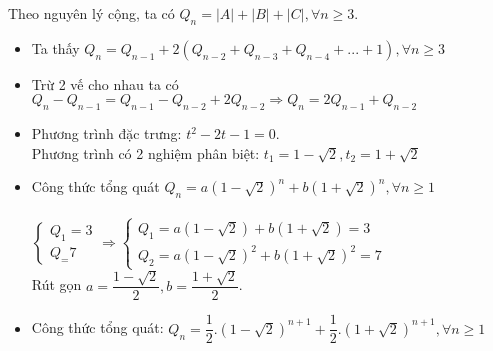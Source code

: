 \documentclass[12pt,oneside]{book}
\begin{document}
Theo nguyên lý cộng, ta có $Q_n=|A|+|B|+|C|, \forall n \geq 3.$
\begin{itemize}
	\item Ta thấy $Q_n = Q_{n-1}+2(Q_{n-2}+Q_{n-3}+Q_{n-4}+...+1), \forall n \geq 3$
	\item Trừ 2 vế cho nhau ta có $Q_n-Q_{n-1}=Q_{n-1}-Q_{n-2}+2Q_{n-2}\Rightarrow Q_n = 2Q_{n-1}+Q_{n-2}$
	\item  Phương trình đặc trưng: $t^2-2t-1 = 0$.
	\\ Phương trình có 2 nghiệm phân biệt: $t_1=1-\sqrt{2}, t_2 = 1+\sqrt{2}$
	\item Công thức tổng quát $Q_n=a(1-\sqrt{2})^n+b(1+\sqrt{2})^n, \forall n \geq 1$\\\\
	$\begin{cases}
		Q_1=3\\Q_=7
	\end{cases}\Rightarrow \begin{cases}
		Q_1=a(1-\sqrt{2})+b(1+\sqrt{2})=3\\
		Q_2=a(1-\sqrt{2})^2+b(1+\sqrt{2})^2=7
	\end{cases}$\\
	Rút  gọn $a = \dfrac{1-\sqrt{2}}{2},b = \dfrac{1+\sqrt{2}}{2}$.
	\item Công thức tổng quát: $Q_n=\dfrac{1}{2}.(1-\sqrt{2})^{n+1}+\dfrac{1}{2}.(1+\sqrt{2})^{n+1}, \forall n \geq 1$
\end{itemize}
\end{document}

